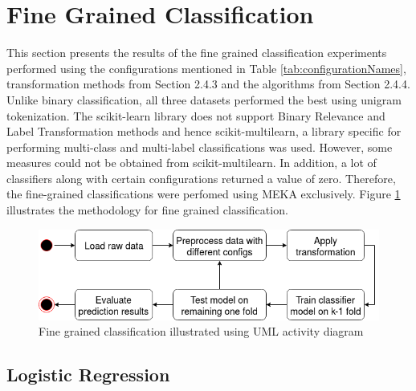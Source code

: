 \documentclass[a4paper,12pt,twoside]{report}
\begin{document}
\section{Fine Grained Classification}
This section presents the results of the fine grained classification experiments performed using the configurations mentioned in Table \ref{tab:configurationNames}, transformation methods from Section 2.4.3 and the algorithms from Section 2.4.4. Unlike  binary classification, all three datasets performed the best using unigram tokenization. The scikit-learn library does not support Binary Relevance and Label Transformation methods and hence scikit-multilearn, a library specific for performing multi-class and multi-label classifications was used. However, some measures could not be obtained from scikit-multilearn. In addition, a lot of classifiers along with certain configurations returned a value of zero. Therefore, the fine-grained classifications were perfomed using MEKA exclusively. Figure \ref{fig:finegrainedClass} illustrates the methodology for fine grained classification. 

\begin{figure}[h] %
    \centering
    \includegraphics[width=12cm]{fine-grained-classification}
    \caption{Fine grained classification illustrated using UML activity diagram}
    \label{fig:finegrainedClass}
\end{figure}

\subsection{Logistic Regression}
\end{document}
